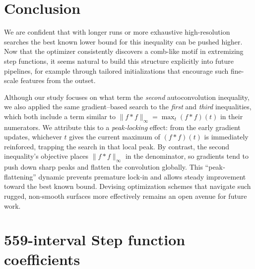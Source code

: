 \documentclass[11pt]{article}
\theoremstyle{definition}
\theoremstyle{remark}
\begin{document}
\section{Conclusion}

We are confident that with longer runs or more exhaustive high-resolution searches the best known lower bound for this inequality can be pushed higher.  
Now that the optimizer consistently discovers a comb-like motif in extremizing step functions, it seems natural to build this structure explicitly into future pipelines, for example through tailored initializations that encourage such fine-scale features from the outset.

Although our study focuses on what \citeauthor{novikov2025alphaevolve} term the \emph{second} autoconvolution inequality, we also applied the same gradient–based search to the \emph{first} and \emph{third} inequalities, which both include a term similar to \(\|f*f\|_{\infty}=\max_{t}(f*f)(t)\) in their numerators.  
We attribute this to a \emph{peak‐locking} effect: from the early gradient updates, whichever \(t\) gives the current maximum of \((f*f)(t)\) is immediately reinforced, trapping the search in that local peak.  By contrast, the second inequality’s objective places \(\|f*f\|_{\infty}\) in the denominator, so gradients tend to push down sharp peaks and flatten the convolution globally.  This “peak‐flattening” dynamic prevents premature lock‐in and allows steady improvement toward the best known bound. Devising optimization schemes that navigate such rugged, non-smooth surfaces more effectively remains an open avenue for future work.



\appendix
\section{559-interval Step function coefficients}\label{app:heights}
\end{document}
